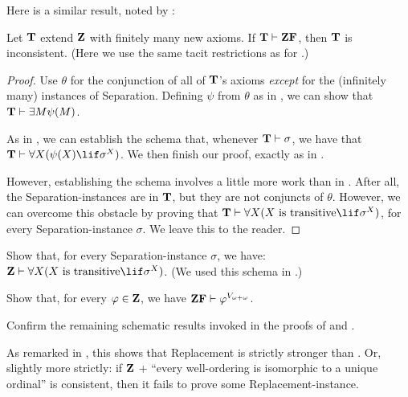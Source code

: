 \documentclass[../../../include/open-logic-section]{subfiles}
\begin{document}
Here is a similar result, noted by \citet[223]{Potter2004}:

\begin{prop}
	Let $\mathbf{T}$ extend $\mathbf{Z}$ with finitely many new axioms. If $\Th{T} \Proves \ZF$, then $\mathbf{T}$ is inconsistent. (Here we use the same tacit restrictions as for .)
\end{prop}
\begin{proof}
	Use $\theta$ for the conjunction of all of $\mathbf{T}$'s axioms \emph{except} for the (infinitely many) instances of Separation. Defining $\psi$ from $\theta$ as in , we can show that $\Th{T} \Proves \exists M \psi(M)$. 
	
	As in , we can establish the schema that, whenever $\Th{T} \Proves \sigma$, we have that $\Th{T} \Proves \forall X(\psi(X) \lif \sigma^X)$. We then finish our proof, exactly as in .
	
	However, establishing the schema involves a little more work than in . After all, the Separation-instances are in $\mathbf{T}$, but they are not conjuncts of $\theta$. However, we can overcome this obstacle by proving that $\Th{T} \Proves \forall X(X\text{ is transitive} \lif \sigma^X)$, for every Separation-instance $\sigma$. We leave this to the reader. 
\end{proof}
\begin{prob}
	Show that, for every Separation-instance $\sigma$, we have: $\Z \Proves \forall X(X\text{ is transitive} \lif \sigma^X)$. (We used this schema in .)
\end{prob}
\begin{prob}
	Show that, for every $\varphi \in \mathbf{Z}$, we have $\ZF \Proves \phi^{V_{\omega+\omega}}$.
\end{prob}
\begin{prob}
	Confirm the remaining schematic results invoked in the proofs of  and  .
\end{prob}

As remarked in , this shows that Replacement is strictly stronger than
. Or, slightly more strictly: if $\mathbf{Z}$ + ``every well-ordering is isomorphic to a unique ordinal'' is consistent, then it fails to prove some Replacement-instance.


\end{document}
